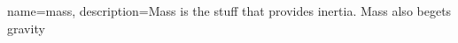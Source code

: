 {
    name=mass,
    description={Mass is the stuff that provides inertia.  Mass also begets gravity}
}
